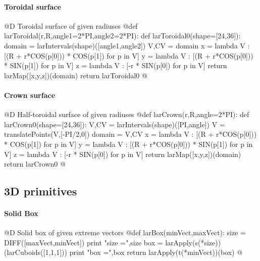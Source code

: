 \documentclass[11pt,oneside]{article}	%
\begin{document}
\paragraph{Toroidal surface}
@D Toroidal surface of given radiuses
@{def larToroidal(r,R,angle1=2*PI,angle2=2*PI):
	def larToroidal0(shape=[24,36]):
		domain = larIntervals(shape)([angle1,angle2])
		V,CV = domain
		x = lambda V : [(R + r*COS(p[0])) * COS(p[1]) for p in V]
		y = lambda V : [(R + r*COS(p[0])) * SIN(p[1]) for p in V]
		z = lambda V : [-r * SIN(p[0]) for p in V]
		return larMap([x,y,z])(domain)
	return larToroidal0
@}
\paragraph{Crown surface}
@D Half-toroidal surface of given radiuses
@{def larCrown(r,R,angle=2*PI):
	def larCrown0(shape=[24,36]):
		V,CV = larIntervals(shape)([PI,angle])
		V = translatePoints(V,[-PI/2,0])
		domain = V,CV
		x = lambda V : [(R + r*COS(p[0])) * COS(p[1]) for p in V]
		y = lambda V : [(R + r*COS(p[0])) * SIN(p[1]) for p in V]
		z = lambda V : [-r * SIN(p[0]) for p in V]
		return larMap([x,y,z])(domain)
	return larCrown0
@}

\subsection{3D primitives}


\paragraph{Solid Box}
@D Solid box of given extreme vectors
@{def larBox(minVect,maxVect):
	size = DIFF([maxVect,minVect])
	print "size =",size
	box = larApply(s(*size))(larCuboids([1,1,1]))
	print "box =",box
	return larApply(t(*minVect))(box)
@}
\end{document}
